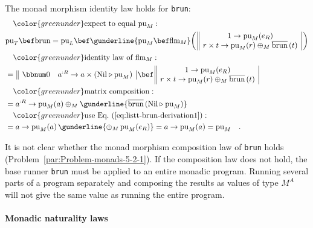 The monad morphism identity law holds for \lstinline!brun!:
\begin{align*}
 & \quad{\color{greenunder}\text{expect to equal }\text{pu}_{M}:}\quad\\
 & \text{pu}_{T}\bef\text{brun}=\text{pu}_{L}\bef\gunderline{\text{pu}_{M}\bef\text{flm}_{M}}\bigg(\,\begin{array}{||c|}
1\rightarrow\text{pu}_{M}(e_{R})\\
r\times t\rightarrow\text{pu}_{M}(r)\oplus_{M}\overline{\text{brun}}\,(t)
\end{array}\,\bigg)\\
 & \quad{\color{greenunder}\text{identity law of }\text{flm}_{M}:}\quad\\
 & =\,\begin{array}{||cc|}
\bbnum 0 & a^{:R}\rightarrow a\times(\text{Nil}\triangleright\text{pu}_{M})\end{array}\,\bef\,\begin{array}{||c|}
1\rightarrow\text{pu}_{M}(e_{R})\\
r\times t\rightarrow\text{pu}_{M}(r)\oplus_{M}\overline{\text{brun}}\,(t)
\end{array}\\
 & \quad{\color{greenunder}\text{matrix composition}:}\quad\\
 & =a^{:R}\rightarrow\text{pu}_{M}(a)\oplus_{M}\gunderline{\overline{\text{brun}}\,(\text{Nil}\triangleright\text{pu}_{M})}\\
 & \quad{\color{greenunder}\text{use Eq.~(\ref{eq:listt-brun-derivation1})}:}\quad\\
 & =a\rightarrow\text{pu}_{M}(a)\,\gunderline{\oplus_{M}\,\text{pu}_{M}(e_{R})}=a\rightarrow\text{pu}_{M}(a)=\text{pu}_{M}\quad.
\end{align*}

It is not clear whether the monad morphism composition law of \lstinline!brun!
holds (Problem~\ref{par:Problem-monads-5-2-1}). If the composition
law does not hold, the base runner \lstinline!brun! must be applied
to an entire monadic program. Running several parts of a program separately
and composing the results as values of type $M^{A}$ will not give
the same value as running the entire program.

\paragraph{Monadic naturality laws}

